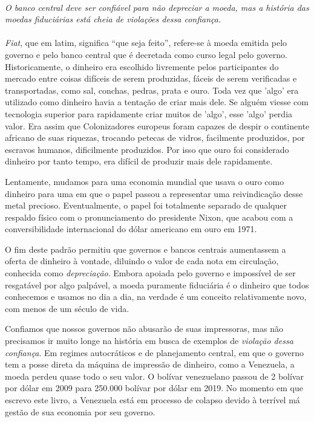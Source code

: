 \paragraph{}
\textit{O banco central deve ser confiável para não depreciar a moeda, mas a história das moedas fiduciárias está cheia de violações dessa confiança.}
\paragraph{}
\textit{Fiat}, que em latim, significa “que seja feito”, refere-se à moeda emitida pelo governo e pelo banco central que é decretada como curso legal pelo governo. Historicamente, o dinheiro era escolhido livremente pelos participantes do mercado entre coisas difíceis de serem produzidas, fáceis de serem verificadas e transportadas, como sal, conchas, pedras, prata e ouro.
Toda vez que 'algo' era utilizado como dinheiro havia a tentação de criar mais dele. Se alguém viesse com tecnologia superior para rapidamente criar muitos de 'algo', esse 'algo' perdia valor. Era assim que Colonizadores europeus foram capazes de despir o continente africano de suas riquezas, trocando petecas de vidros, facilmente produzidos, por escravos humanos, dificilmente produzidos. Por isso que ouro foi considerado dinheiro por tanto tempo, era difícil de produzir mais dele rapidamente.

Lentamente, mudamos para uma economia mundial que usava o ouro como dinheiro para uma em que o papel passou a representar uma reivindicação desse metal precioso. Eventualmente, o papel foi totalmente separado de qualquer respaldo físico com o pronunciamento do presidente Nixon, que acabou com a conversibilidade internacional do dólar americano em ouro em 1971. 

O fim deste padrão permitiu que governos e bancos centrais aumentassem a oferta de dinheiro à vontade, diluindo o valor de cada nota em circulação, conhecida como \textit{depreciação}. Embora apoiada pelo governo e impossível de ser resgatável por algo palpável, a moeda puramente fiduciária é o dinheiro que todos conhecemos e usamos no dia a dia, na verdade é um conceito relativamente novo, com menos de um século de vida.

Confiamos que nossos governos não abusarão de suas impressoras, mas não precisamos ir muito longe na história em busca de exemplos de \textit{violação dessa confiança}. Em regimes autocráticos e de planejamento central, em que o governo tem a posse direta da máquina de impressão de dinheiro, como a Venezuela, a moeda perdeu quase todo o seu valor. O bolívar venezuelano passou de 2 bolívar por dólar em 2009 para 250.000 bolívar por dólar em 2019. No momento em que escrevo este livro, a Venezuela está em processo de colapso devido à terrível má gestão de sua economia por seu governo.

